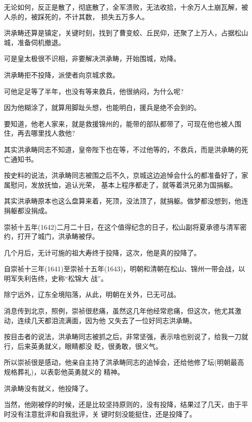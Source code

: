 \documentclass[11pt,a4paper,onecolumn]{article}
\begin{document}
无论如何，反正是散了，彻底散了，全军溃败，无法收拾，十余万人土崩瓦解，被人杀的，被踩死的，不计其数，
损失五万多人。

洪承畴还算是镇定，关键时刻，找到了曹变蛟、丘民仰，还聚了上万人，占据松山城，准备伺机撤退。

可是皇太极很不识相，非要解决洪承畴，开始围城，劝降。

洪承畴拒不投降，派使者向京城求救。

可他足足等了半年，也没有等来救兵，他很纳闷，为什么呢?

因为他糊涂了，就算用脚趾头想，也能明白，援兵是绝不会到的。

要知道，他老人家来，就是救援锦州的，能带的部队都带了，可现在他也被人围住，再去哪里找人救他?

其实洪承畴同志不知道，皇帝陛下也在等，不过他等的，不救兵，而是洪承畴的死亡通知书。

按史料的说法，洪承畴同志被围之后不久，京城这边追悼会什么的都准备好了，家属慰问，发放抚恤，追认光荣，
基本上程序都走了，就等着洪兄弟为国捐躯。

其实洪承畴原本也这么盘算来着，死顶，没法顶了，就捐躯。做梦都没想到，他连捐躯都没捐成。

崇祯十五年(1642)二月二十日，在这个值得纪念的日子，松山副将夏承德与清军密约，打开了城门，洪承畴被俘。

几个月后，无计可施的祖大寿终于投降，这次，他是真的投降了。

自崇祯十三年(1641)至崇祯十五年(1643)，明朝和清朝在松山、锦州一带会战，以明军失利告终，史称``松锦大
战''。

除宁远外，辽东全境陷落，从此，明朝在关外，已无可战。

消息传到北京，照例，崇祯很悲痛，虽然这几年他经常悲痛，但这次，他尤其激动，连续几天都泪流满面，因为他
又失去了一位好同志\myrule 洪承畴。

按目击者的说法，洪承畴同志被抓之后，非常坚强，表示啥也别说了，给我一刀就行，后来英勇就义，眼睛都没
眨，很勇敢，很义气。

所以崇祯很是感动，他亲自主持了洪承畴同志的追悼会，还给他修了坛(明朝最高规格葬礼)，以表彰他英勇就义的
精神。

洪承畴没有就义，他投降了。

当然，他刚被俘的时候，还是比较坚持原则的，没有投降，结果过了几天，由于平时没有注意批评和自我批评，关
键时刻没能挺住，还是投降了。

\section[\thesection]{}
\end{document}
